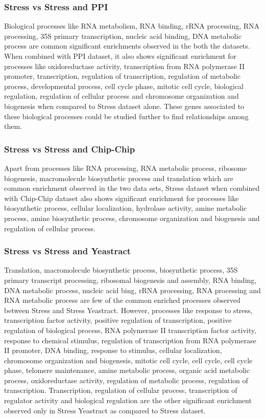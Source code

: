 \subsubsection{Stress vs Stress and PPI}

Biological processes like RNA metabolism, RNA binding, rRNA processing, RNA processing, 35S primary transcription, nucleic acid binding, DNA metabolic process are common 
significant enrichments observed in the both the datasets. When combined with PPI dataset, it also shows significant enrichment for processes like oxidoreductase activity, 
transcription from RNA polymerase II promoter, transcription, regulation of transcription, regulation of metabolic process, developmental process, cell cycle phase, 
mitotic cell cycle, biological regulation, regulation of cellular process and chromosome organization and biogenesis when compared to Stress dataset alone. These genes associated to these
biological processes could be studied further to find relationships among them.

\subsubsection{Stress vs Stress and Chip-Chip}

Apart from processes like RNA processing, RNA metabolic process, ribosome biogenesis, macromolecule biosynthetic process and translation which are common enrichment observed 
in the two data sets, Stress dataset when combined with Chip-Chip dataset also shows significant enrichment for processes like biosynthetic process, cellular localization, 
hydrolase activity, amine metabolic process, amine biosynthetic process, chromosome organization and biogenesis and regulation of cellular process.

\subsubsection{Stress vs Stress and Yeastract}

Translation, macromolecule biosynthetic process, biosynthetic process, 35S primary transcript processing, ribosomal biogenesis and assembly, RNA binding, DNA metabolic process, 
nucleic acid bing, rRNA processing, RNA processing and RNA metabolic process are few of the common enriched processes observed between Stress and Stress Yeastract. 
However, processes like response to stress, transcription factor activity, positive regulation of transcription, positive regulation of biological process, 
RNA polymerase II transcription factor activity, response to chemical stimulus, regulation of transcription from RNA polymerase II promoter, 
DNA binding, response to stimulus, cellular localization, chromosome organization and biogenesis, mitotic cell cycle, cell cycle, cell cycle phase, 
telomere maintenance, amine metabolic process, organic acid metabolic process, oxidoreductase activity, regulation of metabolic process, regulation of transcription. 
Transcription, regulation of cellular process, transcription of regulator activity and biological regulation are the other significant enrichment observed only 
in Stress Yeastract as compared to Stress dataset.

